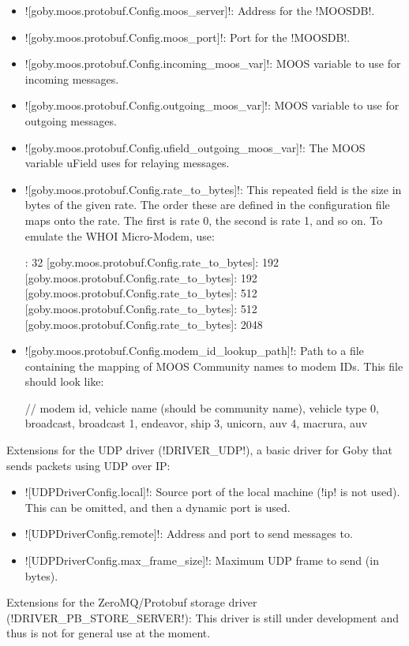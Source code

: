 \begin{itemize}
\item ![goby.moos.protobuf.Config.moos_server]!: Address for the !MOOSDB!.
\item ![goby.moos.protobuf.Config.moos_port]!: Port for the !MOOSDB!.
\item ![goby.moos.protobuf.Config.incoming_moos_var]!: MOOS variable to use for incoming messages.
\item ![goby.moos.protobuf.Config.outgoing_moos_var]!: MOOS variable to use for outgoing messages.
\item ![goby.moos.protobuf.Config.ufield_outgoing_moos_var]!: The MOOS variable uField uses for relaying messages.
\item ![goby.moos.protobuf.Config.rate_to_bytes]!: This repeated field is the size in bytes of the given rate. The order these are defined in the configuration file maps onto the rate. The first is rate 0, the second is rate 1, and so on. To emulate the WHOI Micro-Modem, use:
\begin{boxedverbatim}
: 32 
[goby.moos.protobuf.Config.rate_to_bytes]: 192 
[goby.moos.protobuf.Config.rate_to_bytes]: 192 
[goby.moos.protobuf.Config.rate_to_bytes]: 512 
[goby.moos.protobuf.Config.rate_to_bytes]: 512 
[goby.moos.protobuf.Config.rate_to_bytes]: 2048 
\end{boxedverbatim}
\resetbvlinenumber
\item ![goby.moos.protobuf.Config.modem_id_lookup_path]!: Path to a file containing the mapping of MOOS Community names to modem IDs.  This file should look like:
\begin{boxedverbatim}
// modem id, vehicle name (should be community name), vehicle type
0, broadcast, broadcast
1, endeavor, ship
3, unicorn, auv
4, macrura, auv
\end{boxedverbatim}
\resetbvlinenumber

\end{itemize} 

Extensions for the UDP driver (!DRIVER_UDP!), a basic driver for Goby that sends packets using UDP over IP:
\resetbvlinenumber

\begin{itemize}
\item ![UDPDriverConfig.local]!: Source port of the local machine (!ip! is not used). This can be omitted, and then a dynamic port is used.
\item ![UDPDriverConfig.remote]!: Address and port to send messages to. 
\item ![UDPDriverConfig.max_frame_size]!: Maximum UDP frame to send (in bytes).
\end{itemize} 

Extensions for the ZeroMQ/Protobuf storage driver (!DRIVER_PB_STORE_SERVER!):
\resetbvlinenumber
This driver is still under development and thus is not for general use at the moment.


\DeleteShortVerb{\!}

